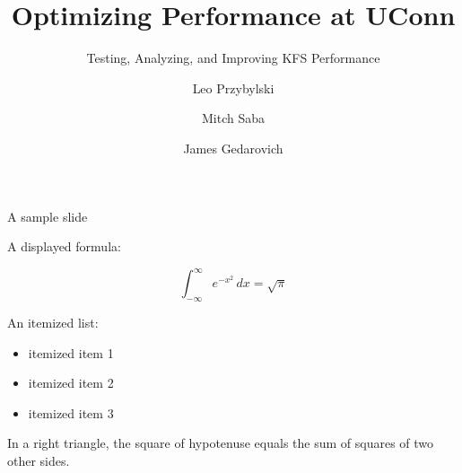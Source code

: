 \documentclass[xcolor=dvipsnames,14pt]{beamer}
\begin{document}
\title[A short proof]{Optimizing Performance at UConn}
\subtitle[Errors]{Testing, Analyzing, and Improving KFS Performance}
\author[Leo]{Leo Przybylski  \and Mitch Saba  \and James Gedarovich }




\begin{frame}[plain]
  \titlepage
\end{frame}

\begin{frame}{A sample slide}

A displayed formula:

\[
  \int_{-\infty}^\infty e^{-x^2} \, dx = \sqrt{\pi}
\]

An itemized list:

\begin{itemize}
  \item itemized item 1
  \item itemized item 2
  \item itemized item 3
\end{itemize}

\begin{theorem}
  In a right triangle, the square of hypotenuse equals
  the sum of squares of two other sides.
\end{theorem}

\end{frame}
\end{document}
